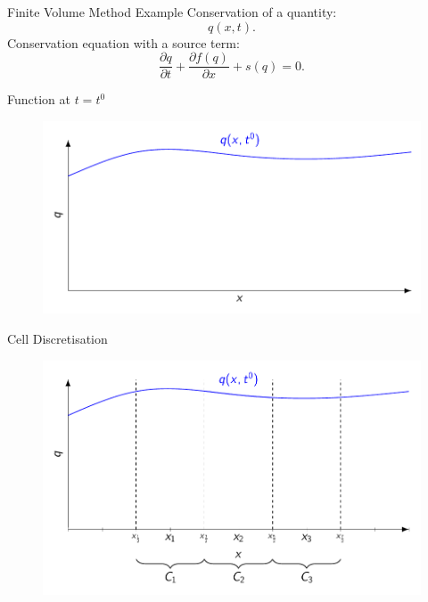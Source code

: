 \documentclass[]{beamer}
\begin{document}
\begin{frame}{Finite Volume Method Example}
Conservation of a quantity: $$q(x,t).$$
\pause
Conservation equation with a source term:
	\begin{equation*}
	{\frac{\partial q}{\partial t}} +  {\frac{\partial f(q)}{\partial x}} + s(q) = 0.
	\end{equation*}
\end{frame}
\begin{frame}{Function at $t=t^0$}
	\begin{figure}
		\includegraphics[width=\textwidth]{./Pics/FVMpicture/Function.pdf}
	\end{figure}
\end{frame}
\begin{frame}{Cell Discretisation}
	\begin{figure}
		\includegraphics[width=\textwidth]{./Pics/FVMpicture/Cells.pdf}
	\end{figure}
\end{frame}
\end{document}
